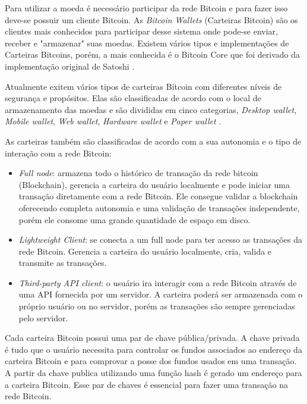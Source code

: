 \documentclass[conference,compsoc]{IEEEtran}
\begin{document}
Para utilizar a moeda é necessário participar da rede Bitcoin e para fazer isso deve-se possuir um cliente Bitcoin. As \textit{Bitcoin Wallets} (Carteiras Bitcoin) são os clientes mais conhecidos para participar desse sistema onde pode-se enviar, receber e "armazenar"{} suas moedas. Existem vários tipos e implementações de Carteiras Bitcoins, porém, a mais conhecida é o Bitcoin Core que foi derivado da implementação original de Satoshi \cite{antonopoulos2017mastering}. 

Atualmente exitem vários tipos de carteiras Bitcoin com diferentes níveis de segurança e propósitos. Elas são classificadas de acordo com o local de armazenamento das moedas e são divididas em cinco categorias, \textit{Desktop wallet}, \textit{Mobile wallet}, \textit{Web wallet}, \textit{Hardware wallet} e \textit{Paper wallet} \cite{antonopoulos2017mastering}. 

As carteiras também são classificadas de acordo com a sua autonomia e o tipo de interação com a rede Bitcoin:

\begin{itemize}
\item \textit{Full node}: armazena todo o histórico de transação da rede bitcoin (Blockchain), gerencia a carteira do usuário localmente e pode iniciar uma transação diretamente com a rede Bitcoin. Ele consegue validar a blockchain oferecendo completa autonomia e uma validação de transações independente, porém ele consome uma grande quantidade de espaço em disco.
\item \textit{Lightweight Client}: se conecta a um full node para ter acesso as transações da rede Bitcoin. Gerencia a carteira do usuário localmente, cria, valida e transmite as transações.
\item \textit{Third-party API client}: o usuário ira interagir com a rede Bitcoin através de uma API fornecida por um servidor. A carteira poderá ser armazenada com o próprio usuário ou no servidor, porém as transações são sempre gerenciadas pelo servidor.
\end{itemize}

Cada carteira Bitcoin possui uma par de chave pública/privada. A chave privada é tudo que o usuário necessita para controlar os fundos associados ao endereço da carteira Bitcoin e para comprovar a posse dos fundos usados em uma transação. A partir da chave publica utilizando uma função hash é gerado um endereço para a carteira Bitcoin. Esse par de chaves é essencial para fazer uma transação na rede Bitcoin.
\end{document}
